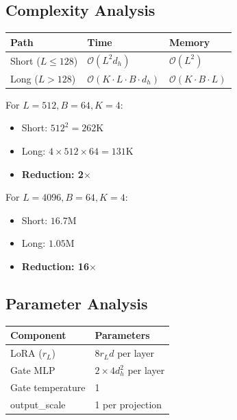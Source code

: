 \subsection{Complexity Analysis}

\begin{table}[H]
\centering
\small
\begin{tabular}{lll}
\toprule
\textbf{Path} & \textbf{Time} & \textbf{Memory} \\
\midrule
Short ($L \leq 128$) & $\mathcal{O}(L^2 d_h)$ & $\mathcal{O}(L^2)$ \\
Long ($L > 128$) & $\mathcal{O}(K \cdot L \cdot B \cdot d_h)$ & $\mathcal{O}(K \cdot B \cdot L)$ \\
\bottomrule
\end{tabular}
\end{table}

For $L = 512, B = 64, K = 4$:

\begin{itemize}
\item Short: $512^2 = 262$K
\item Long: $4 \times 512 \times 64 = 131$K
\item \textbf{Reduction: 2$\times$}

\end{itemize}
For $L = 4096, B = 64, K = 4$:

\begin{itemize}
\item Short: $16.7$M
\item Long: $1.05$M
\item \textbf{Reduction: 16$\times$}

\end{itemize}
\subsection{Parameter Analysis}

\begin{table}[H]
\centering
\small
\begin{tabular}{ll}
\toprule
\textbf{Component} & \textbf{Parameters} \\
\midrule
LoRA ($r_L$) & $8 r_L d$ per layer \\
Gate MLP & $2 \times 4 d_h^2$ per layer \\
Gate temperature & 1 \\
output\_scale & 1 per projection \\
\bottomrule
\end{tabular}
\end{table}

